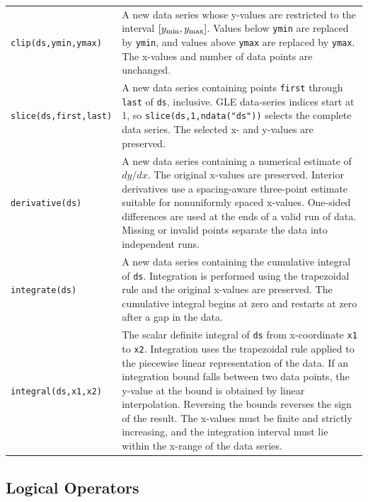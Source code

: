 \begin{supertabular}{lp{10cm}}
{\tt clip(ds,ymin,ymax)}  & A new data series whose y-values are restricted to the interval $[y_{\rm min},y_{\rm max}]$. Values below {\tt ymin} are replaced by {\tt ymin}, and values above {\tt ymax} are replaced by {\tt ymax}. The x-values and number of data points are unchanged. \\
{\tt slice(ds,first,last)}  & A new data series containing points {\tt first} through {\tt last} of {\tt ds}, inclusive. GLE data-series indices start at 1, so {\tt slice(ds,1,ndata("ds"))} selects the complete data series. The selected x- and y-values are preserved. \\
{\tt derivative(ds)}  & A new data series containing a numerical estimate of $dy/dx$. The original x-values are preserved. Interior derivatives use a spacing-aware three-point estimate suitable for nonuniformly spaced x-values. One-sided differences are used at the ends of a valid run of data. Missing or invalid points separate the data into independent runs. \\
{\tt integrate(ds)}  & A new data series containing the cumulative integral of {\tt ds}. Integration is performed using the trapezoidal rule and the original x-values are preserved. The cumulative integral begins at zero and restarts at zero after a gap in the data. \\
{\tt integral(ds,x1,x2)}  & The scalar definite integral of {\tt ds} from x-coordinate {\tt x1} to {\tt x2}. Integration uses the trapezoidal rule applied to the piecewise linear representation of the data. If an integration bound falls between two data points, the y-value at the bound is obtained by linear interpolation. Reversing the bounds reverses the sign of the result. The x-values must be finite and strictly increasing, and the integration interval must lie within the x-range of the data series. \\
\hline \end{supertabular}


\subsection{Logical Operators}

